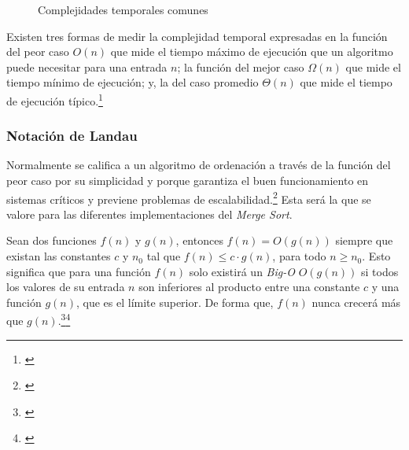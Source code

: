 \documentclass[titlepage]{article}
\begin{document}
\begin{figure}[h]
\begin{minipage}{0.49\textwidth}
			\label{fig:timeComplexities}
			\caption{Complejidades temporales comunes
			\phantom{estoEsUnTextoFantasma}}
		\end{minipage}
	\end{figure}

Existen tres formas de medir la complejidad temporal expresadas en la función del peor caso \(O(n)\) que mide el tiempo máximo de ejecución que un algoritmo puede necesitar para una entrada $n$; la función del mejor caso \(\Omega(n)\) que mide el tiempo mínimo de ejecución; y, la del caso promedio \(\Theta(n)\) que mide el tiempo de ejecución típico.\footnote{\cite{levitin2012introduction}}

\subsubsection{Notación de Landau}%
Normalmente se califica a un algoritmo de ordenación a través de la función del peor caso por su simplicidad y porque garantiza el buen funcionamiento en sistemas críticos y previene problemas de escalabilidad.\footnote{\cite{Correa2024}} Esta será la que se valore para las diferentes implementaciones del \textit{Merge Sort}.

 Sean dos funciones \(f(n)\) y \(g(n)\), entonces \(f(n) = O(g(n))\) siempre que existan las constantes \(c\) y \(n_0\) tal que \(f(n) \leq c\cdot g(n)\), para todo \(n \geq n_0\). Esto significa que para una función \(f(n)\) solo existirá un \textit{Big-O} \(O(g(n))\) si todos los valores de su entrada \(n\) son inferiores al producto entre una constante \(c\) y una función \(g(n)\), que es el límite superior. De forma que, \(f(n)\) nunca crecerá más que \(g(n)\).\footnote{\cite{Sipser1997}}\footnote{\cite{landau-1909}}
\end{document}
